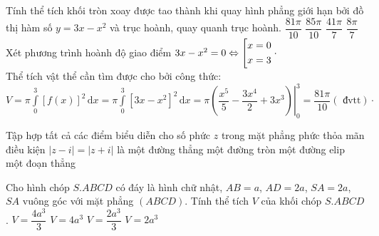 \begin{ex}%
	Tính thể tích khối tròn xoay được tao thành khi quay hình phẳng giới hạn bởi đồ thị hàm số $ y = 3x - x^2 $ và trục hoành, quay quanh trục hoành.
	\choice
	{\True $ \dfrac{81 \pi}{10} $}
	{$ \dfrac{85 \pi}{10} $}
	{$ \dfrac{41 \pi}{7} $}
	{$ \dfrac{8 \pi}{7} $}
	\loigiai
	{Xét phương trình hoành độ giao điểm $ 3x - x^2 = 0 \Leftrightarrow \left[\begin{aligned}x = 0\\x=3\end{aligned}\right. \cdot $\\
		Thể tích vật thể cần tìm được cho bởi công thức:\\
		$V = \pi \displaystyle\int\limits_{0}^3 \left[f(x)\right]^2\mathrm{\,d}x = \pi \displaystyle\int\limits_0^3 \left[3x - x^2\right]^2\mathrm{\,d}x = \pi \left. \left(\dfrac{x^5}{5} - \dfrac{3x^4}{2} + 3x^3\right) \right|_0^3 = \dfrac{81 \pi}{10} (\text{ đvtt})\cdot $	
	}
\end{ex}	
\begin{ex}%
	Tập hợp tất cả các điểm biểu diễn cho số phức $z$ trong mặt phẳng phức thỏa mãn điều kiện $\left|z-i\right|=\left|z+i\right|$ là
	\choice
	{\True một đường thẳng}
	{một đường tròn}
	{một đường elip}
	{một đoạn thẳng}
\end{ex}
\begin{ex}%
	Cho hình chóp $S.ABCD$ có đáy là hình chữ nhật, $AB=a$, $AD=2a$, $SA=2a$, $SA$ vuông góc với mặt phẳng $(ABCD)$. Tính thể tích $V$ của khối chóp $S.ABCD$. 
	\choice
	{\True $V=\dfrac{4a^3}{3}$}
	{$V=4a^3$}
	{$V=\dfrac{2a^3}{3}$}
	{$V=2a^3$}
\end{ex}
